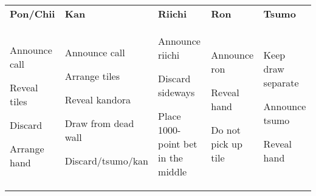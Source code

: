 \begin{tabularx}{\linewidth}{XXXXX}
  {\large\bfseries Pon/Chii} & {\large\bfseries Kan} & {\large\bfseries Riichi} & {\large\bfseries Ron} & {\large\bfseries Tsumo}\\
  \begin{callprocedure}
    \item Announce call
    \item Reveal tiles
    \item Discard
    \item Arrange hand
  \end{callprocedure} &
  \begin{callprocedure}
    \item Announce call
    \item Arrange tiles
    \item Reveal kandora
    \item Draw from dead wall
    \item Discard/\linebreak[0]tsumo/\linebreak[0]kan
  \end{callprocedure} &
  \begin{callprocedure}
    \item Announce riichi
    \item Discard sideways
    \item Place 1000-point bet in the middle
  \end{callprocedure} &
  \begin{callprocedure}
    \item Announce ron
    \item Reveal hand
    \item Do not pick up tile
  \end{callprocedure} &
  \begin{callprocedure}
  \item Keep draw separate
  \item Announce tsumo
  \item Reveal hand
  \end{callprocedure}

\end{tabularx}
